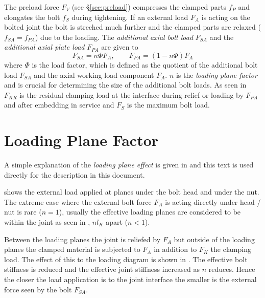The preload force $F_V$ (see §\ref{sec:preload}) compresses the clamped parts $f_P$ and elongates
the bolt $f_S$ during tightening. If an external load $F_A$ is acting on the bolted joint the bolt
is streched much further and the clamped parts are relaxed ($f_{SA}=f_{PA}$) due to the loading. 
The \emph{additional axial bolt load} $F_{SA}$ and the \emph{additional axial plate load}\footnotemark[1]
 $F_{PA}$ are given to
\begin{equation}
  F_{SA} = n \Phi F_A, \qquad F_{PA} = (1-n \Phi) F_A
  \label{equ:FSA_FPA}
\end{equation}
where $\Phi$ is the load factor, which is defined as the quotient of the additional bolt load $F_{SA}$ 
and the axial working load component $F_A$. $n$ is the \emph{loading plane factor} and is crucial
for determining the size of the additional bolt loads. As seen in  $F_{KR}$ is the residual
clamping load at the interface during relief or loading by $F_{PA}$ and after embedding in service and 
$F_S$ is the maximum bolt load. 
\section{Loading Plane Factor}
A simple explanation of the \emph{loading plane effect} is given in \cite{ESAPSS} and this text is 
used directly for the description in this document. 

 shows the external load applied at planes under the bolt head and under the nut. 
The extreme case where the external bolt force $F_A$ is acting directly under head / nut is rare
($n=1$), usually the effective loading planes are considered to be within the joint as seen in 
, $n l_K$ apart ($n<1$). 

Between the loading planes the joint is reliefed by $F_A$ but outside of the loading planes the clamped
material is subjected to $F_A$ in addition to $F_K$ the clamping load. The effect of this to the loading 
diagram is shown in . The effective bolt stiffness is reduced and the 
effective joint stiffness increased as $n$ reduces. Hence the closer the load application is to the 
joint interface the smaller is the external force seen by the bolt $F_{SA}$. 

